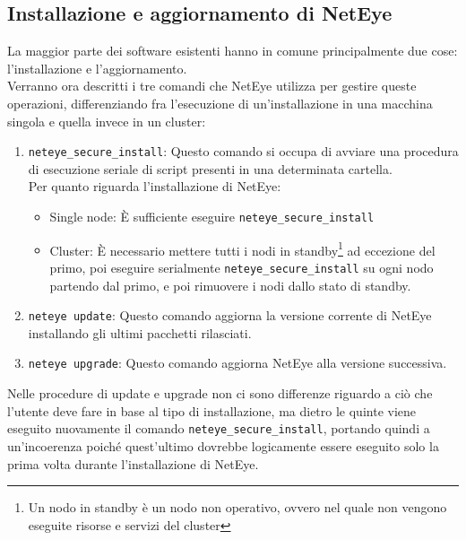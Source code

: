 \subsection{Installazione e aggiornamento di NetEye}
\label{sub:install_update} La maggior parte dei software esistenti hanno in comune
principalmente due cose: l'installazione e l'aggiornamento.\\ Verranno ora
descritti i tre comandi che NetEye utilizza per gestire queste operazioni, differenziando
fra l'esecuzione di un'installazione in una macchina singola e quella invece in un
cluster:
\begin{enumerate}
  \item \texttt{neteye\_secure\_install}: Questo comando si occupa di avviare una
    procedura di esecuzione seriale di script presenti in una determinata cartella.\\
    Per quanto riguarda l'installazione di NetEye:
    \begin{itemize}
      \item Single node: È sufficiente eseguire \texttt{neteye\_secure\_install}

      \item Cluster: È necessario mettere tutti i nodi in standby\footnote{Un
        nodo in standby è un nodo non operativo, ovvero nel quale non vengono eseguite
        risorse e servizi del cluster} ad eccezione del primo, poi eseguire
        serialmente \texttt{neteye\_secure\_install} su ogni nodo partendo dal primo,
        e poi rimuovere i nodi dallo stato di standby.
    \end{itemize}

  \item \texttt{neteye update}: Questo comando aggiorna la versione corrente di NetEye
    installando gli ultimi pacchetti rilasciati.

  \item \texttt{neteye upgrade}: Questo comando aggiorna NetEye alla versione successiva.
\end{enumerate}
Nelle procedure di update e upgrade non ci sono differenze riguardo a ciò che l'utente
deve fare in base al tipo di installazione, ma dietro le quinte viene eseguito nuovamente
il comando \texttt{neteye\_secure\_install}, portando quindi a un'incoerenza poiché
quest'ultimo dovrebbe logicamente essere eseguito solo la prima volta durante l'installazione
di NetEye.

